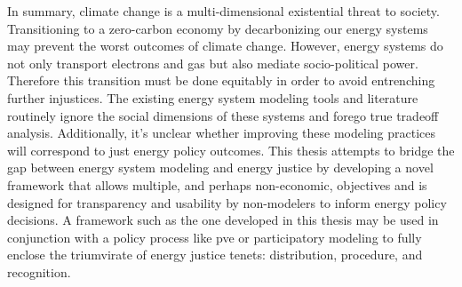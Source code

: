In summary, climate change is a multi-dimensional existential threat to society.
Transitioning to a zero-carbon economy by decarbonizing our energy systems may
prevent the worst outcomes of climate change. However, energy systems do not
only transport electrons and gas but also mediate socio-political power.
Therefore this transition must be done equitably in order to avoid entrenching
further injustices. The existing energy system modeling tools and literature
routinely ignore the social dimensions of these systems and forego true
tradeoff analysis. Additionally, it's unclear whether improving these modeling
practices will correspond to just energy policy outcomes. This thesis attempts
to bridge the gap between energy system modeling and energy justice by
developing a novel framework that allows multiple, and perhaps non-economic,
objectives and is designed for transparency and usability by non-modelers to
inform energy policy decisions. A framework such as the one developed in this
thesis may be used in conjunction with a policy process like \ac{pve} or
participatory modeling to fully enclose the triumvirate of energy justice
tenets: distribution, procedure, and recognition.
